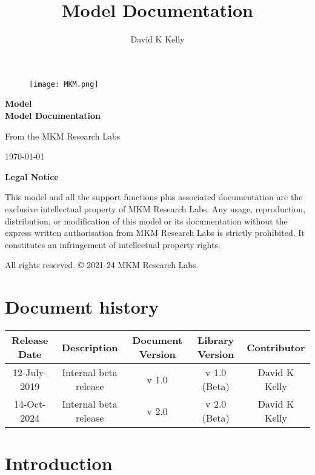 \documentclass{article}
\title{Model Documentation}
\author{David K Kelly}
\date{}
\begin{document}
\begin{titlepage}
\begin{center}

\begin{figure}
	\centering
	\texttt{[image: MKM.png]}
\end{figure}

\vspace{2cm}

{\Huge\bfseries Model\\Model Documentation\par}

\vspace{2cm}

{\Large From the MKM Research Labs\par}

\vspace{1cm}

{\large \today\par}

\end{center}
\end{titlepage}
\newpage

\tableofcontents

\newpage
\begin{center}
\large\textbf{Legal Notice}



\vspace{2em}

\noindent This model and all the support functions plus associated documentation are the exclusive intellectual property of MKM Research Labs. Any usage, reproduction, distribution, or modification of this model or its documentation without the express written authorisation from MKM Research Labs is strictly prohibited.   It constitutes an infringement of intellectual property rights. 

\vspace{1em}

\noindent All rights reserved. © 2021-24 MKM Research Labs.

\vspace{2em}
\end{center}
\clearpage

\section{Document history}
\begin{table}[ht]
	\centering
	\begin{tabular}{c|c|c|c|c}
		Release Date & Description & Document Version & Library Version & Contributor\\
		\hline
		12-July-2019 & Internal beta release & v 1.0 & v 1.0 (Beta) & David K Kelly\\
		14-Oct-2024 & Internal beta release & v 2.0 & v 2.0 (Beta) & David K Kelly\\
	\end{tabular}
	\label{tab:revision_history}
\end{table}

\clearpage

\section{Introduction}

\appendix
\end{document}
